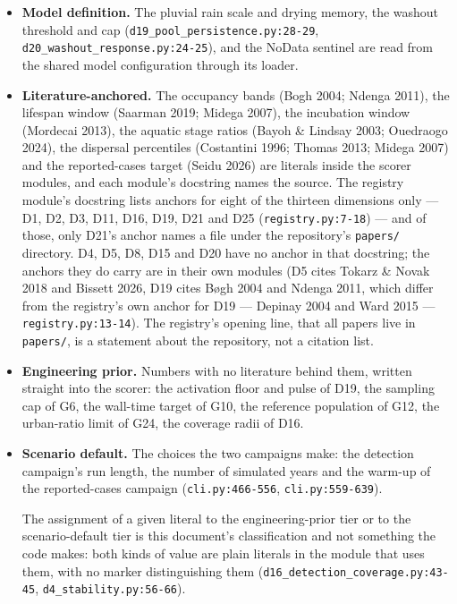 \documentclass[11pt,a4paper]{article}
\newcommand{\code}[1]{\texttt{#1}}
\begin{document}
\begin{itemize}
\item \textbf{Model definition.} The pluvial rain scale and drying memory,
      the washout threshold and cap
      (\code{d19\_pool\_persistence.py:28-29},
      \code{d20\_washout\_response.py:24-25}), and the NoData sentinel are
      read from the shared model configuration through its loader.
\item \textbf{Literature-anchored.} The occupancy bands (Bogh 2004; Ndenga
      2011), the lifespan window (Saarman 2019; Midega 2007), the incubation
      window (Mordecai 2013), the aquatic stage ratios (Bayoh \& Lindsay
      2003; Ouedraogo 2024), the dispersal percentiles (Costantini 1996;
      Thomas 2013; Midega 2007) and the reported-cases target (Seidu 2026)
      are literals inside the scorer modules, and each module's docstring
      names the source. The registry module's docstring lists anchors for
      eight of the thirteen dimensions only --- D1, D2, D3, D11, D16, D19,
      D21 and D25 (\code{registry.py:7-18}) --- and of those, only D21's
      anchor names a file under the repository's \code{papers/} directory.
      D4, D5, D8, D15 and D20 have no anchor in that docstring; the anchors
      they do carry are in their own modules (D5 cites Tokarz \& Novak 2018
      and Bissett 2026, D19 cites Bøgh 2004 and Ndenga 2011, which differ
      from the registry's own anchor for D19 --- Depinay 2004 and Ward 2015
      --- \code{registry.py:13-14}). The registry's opening line, that all
      papers live in \code{papers/}, is a statement about the repository,
      not a citation list.
\item \textbf{Engineering prior.} Numbers with no literature behind them,
      written straight into the scorer: the activation floor and pulse of
      D19, the sampling cap of G6, the wall-time target of G10, the
      reference population of G12,
      the urban-ratio limit of G24, the coverage radii of D16.
\item \textbf{Scenario default.} The choices the two campaigns make: the
      detection campaign's run length, the number of simulated years and
      the warm-up of the reported-cases campaign (\code{cli.py:466-556},
      \code{cli.py:559-639}).

The assignment of a given literal to the engineering-prior tier or to the
scenario-default tier is this document's classification and not something
the code makes: both kinds of value are plain literals in the module that
uses them, with no marker distinguishing them
(\code{d16\_detection\_coverage.py:43-45},
\code{d4\_stability.py:56-66}).
\end{itemize}
\end{document}

